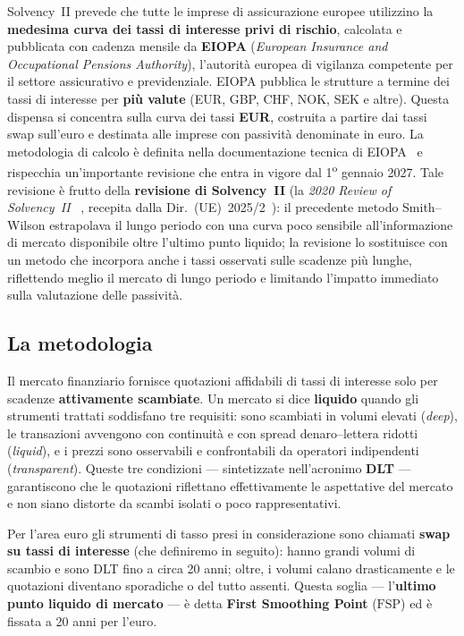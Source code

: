 \documentclass[11pt,a4paper]{article}
\theoremstyle{plain}
\theoremstyle{definition}
\theoremstyle{remark}
\newcommand{\FSP}{\mathrm{FSP}}
\begin{document}
Solvency~II prevede che tutte le imprese di assicurazione europee utilizzino la \textbf{medesima
curva dei tassi di interesse privi di rischio}, calcolata e pubblicata con cadenza mensile da
\textbf{EIOPA} (\emph{European Insurance and Occupational Pensions Authority}), l'autorit\`a
europea di vigilanza competente per il settore assicurativo e previdenziale. EIOPA pubblica le
strutture a termine dei tassi di interesse per \textbf{pi\`u valute} (EUR, GBP, CHF, NOK, SEK e
altre). Questa dispensa si concentra sulla curva dei tassi \textbf{EUR}, costruita a partire dai
tassi swap sull'euro e destinata alle imprese con passivit\`a denominate in euro. La metodologia
di calcolo \`e definita nella documentazione tecnica di EIOPA~\cite{eiopa2026} e rispecchia
un'importante revisione che entra in vigore dal 1\textsuperscript{o} gennaio 2027. Tale revisione
\`e frutto della \textbf{revisione di Solvency~II} (la \emph{2020 Review of Solvency~II}%
~\cite{eiopa2020opinion}, recepita dalla Dir.~(UE)~2025/2~\cite{dir2025}): il precedente metodo
Smith--Wilson estrapolava il lungo periodo con una curva poco sensibile all'informazione di
mercato disponibile oltre l'ultimo punto liquido; la revisione lo sostituisce con un metodo che
incorpora anche i tassi osservati sulle scadenze pi\`u lunghe, riflettendo meglio il mercato di
lungo periodo e limitando l'impatto immediato sulla valutazione delle passivit\`a.

\subsection{La metodologia}

Il mercato finanziario fornisce quotazioni affidabili di tassi di interesse solo per scadenze
\textbf{attivamente scambiate}. Un mercato si dice \textbf{liquido} quando gli strumenti
trattati soddisfano tre requisiti: sono scambiati in volumi elevati (\emph{deep}), le
transazioni avvengono con continuità e con spread denaro--lettera ridotti (\emph{liquid}),
e i prezzi sono osservabili e confrontabili da operatori indipendenti (\emph{transparent}).
Queste tre condizioni --- sintetizzate nell'acronimo \textbf{DLT} --- garantiscono che le
quotazioni riflettano effettivamente le aspettative del mercato e non siano distorte da
scambi isolati o poco rappresentativi.

Per l'area euro gli strumenti di tasso presi in considerazione sono chiamati \textbf{swap su
tassi di interesse} (che definiremo in seguito): hanno grandi volumi di scambio e sono DLT fino a
circa 20 anni; oltre, i volumi calano drasticamente e le quotazioni diventano sporadiche o del
tutto assenti. Questa soglia --- l'\textbf{ultimo punto liquido di mercato} --- \`e detta
\textbf{First Smoothing Point} ($\FSP$) ed \`e fissata a 20 anni per l'euro.
\end{document}
